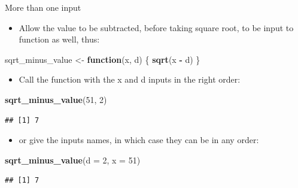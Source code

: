 \documentclass[
  ignorenonframetext,
]{beamer}
\newenvironment{Shaded}{\begin{snugshade}}{\end{snugshade}}
\newcommand{\ControlFlowTok}[1]{\textcolor[rgb]{0.13,0.29,0.53}{\textbf{#1}}}
\newcommand{\DataTypeTok}[1]{\textcolor[rgb]{0.13,0.29,0.53}{#1}}
\newcommand{\DecValTok}[1]{\textcolor[rgb]{0.00,0.00,0.81}{#1}}
\newcommand{\KeywordTok}[1]{\textcolor[rgb]{0.13,0.29,0.53}{\textbf{#1}}}
\newcommand{\NormalTok}[1]{#1}
\newcommand{\OperatorTok}[1]{\textcolor[rgb]{0.81,0.36,0.00}{\textbf{#1}}}
\newcommand{\StringTok}[1]{\textcolor[rgb]{0.31,0.60,0.02}{#1}}
\providecommand{\tightlist}{%
  \setlength{\itemsep}{0pt}\setlength{\parskip}{0pt}}
\begin{document}
\begin{frame}[fragile]{More than one input}
\protect\hypertarget{more-than-one-input}{}

\begin{itemize}
\tightlist
\item
  Allow the value to be subtracted, before taking square root, to be
  input to function as well, thus:
\end{itemize}

\begin{Shaded}
\begin{Highlighting}[]
\NormalTok{sqrt_minus_value <-}\StringTok{ }\ControlFlowTok{function}\NormalTok{(x, d) \{}
  \KeywordTok{sqrt}\NormalTok{(x }\OperatorTok{-}\StringTok{ }\NormalTok{d)}
\NormalTok{\}}
\end{Highlighting}
\end{Shaded}

\begin{itemize}
\tightlist
\item
  Call the function with the x and d inputs in the right order:
\end{itemize}

\begin{Shaded}
\begin{Highlighting}[]
\KeywordTok{sqrt_minus_value}\NormalTok{(}\DecValTok{51}\NormalTok{, }\DecValTok{2}\NormalTok{)}
\end{Highlighting}
\end{Shaded}

\begin{verbatim}
## [1] 7
\end{verbatim}

\begin{itemize}
\tightlist
\item
  or give the inputs names, in which case they can be in any order:
\end{itemize}

\begin{Shaded}
\begin{Highlighting}[]
\KeywordTok{sqrt_minus_value}\NormalTok{(}\DataTypeTok{d =} \DecValTok{2}\NormalTok{, }\DataTypeTok{x =} \DecValTok{51}\NormalTok{)}
\end{Highlighting}
\end{Shaded}

\begin{verbatim}
## [1] 7
\end{verbatim}

\end{frame}
\end{document}
